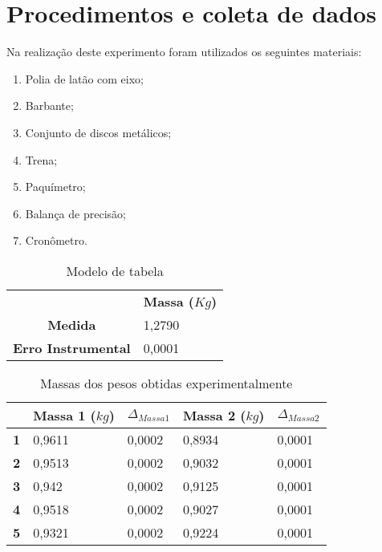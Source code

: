\documentclass[a4paper]{article}
\begin{document}
\section{Procedimentos e coleta de dados}

Na realização deste experimento foram utilizados os seguintes materiais: 
\begin{enumerate} 
	\item Polia de latão com eixo;
	\item Barbante;
	\item Conjunto de discos metálicos;
	\item Trena;
	\item Paquímetro;
	\item Balança de precisão;
	\item Cronômetro.
 \end {enumerate} 

\begin{table}[!ht]
	\begin{center}
		\caption{Modelo de tabela}
		\begin{tabular}{| l | l |}
			\cline{2-2} \multicolumn{0}{c|}{ } & \multicolumn{1}{c|}{\textbf{Massa ($Kg$)}} \\  \cline{1-2}
			\multicolumn{0}{|c|}{\textbf{Medida}} & 1,2790\\ \hline
			\multicolumn{0}{|c|}{\textbf{Erro Instrumental}} & 0,0001\\ \hline
		\end{tabular}
	\end{center}
\end{table}

\begin{table}[!ht]
	\begin{center}
	\caption{Massas dos pesos obtidas experimentalmente}
    \begin{tabular}{|l|l|l|l|l|}
    \hline
    ~ & \textbf{Massa 1} ($kg$) & $\Delta_{Massa 1}$ & \textbf{Massa 2} ($kg$) & $\Delta_{Massa 2}$ \\ \hline
    \textbf{1} & 0,9611  & 0,0002  & 0,8934  & 0,0001  \\ \hline
    \textbf{2} & 0,9513  & 0,0002  & 0,9032  & 0,0001  \\ \hline
    \textbf{3} & 0,942   & 0,0002  & 0,9125  & 0,0001  \\ \hline
    \textbf{4} & 0,9518  & 0,0002  & 0,9027  & 0,0001  \\ \hline
    \textbf{5} & 0,9321  & 0,0002  & 0,9224  & 0,0001  \\ \hline
    \end{tabular}
    \end{center}
\end{table}
\end{document}
